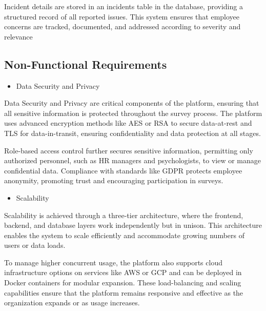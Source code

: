 \documentclass[conference]{IEEEtran}
\begin{document}
    Incident details are stored in an incidents
    table in the database, providing a structured record of all 
    reported issues. This system ensures that employee concerns are 
    tracked, documented, and addressed according to severity and 
    relevance
    \newline    
    \newline  
    
    \subsection {Non-Functional Requirements}
   
    \begin{itemize}
        \item Data Security and Privacy
        \end{itemize}
    
    Data Security and Privacy are critical components of the platform, 
    ensuring that all sensitive information is protected throughout the 
    survey process. The platform uses advanced encryption methods like 
    AES or RSA to secure data-at-rest and TLS for data-in-transit, 
    ensuring confidentiality and data protection at all stages. 
    \newline

    Role-based access control further secures sensitive information, 
    permitting only authorized personnel, such as HR managers and 
    psychologists, to view or manage confidential data. Compliance with
    standards like GDPR protects employee anonymity, promoting trust 
    and encouraging participation in surveys.
    \newline    

    \begin{itemize}
        \item Scalability
        \end{itemize}
    
    Scalability is achieved through a three-tier architecture, where the 
    frontend, backend, and database layers work independently but in 
    unison. This architecture enables the system to scale efficiently 
    and accommodate growing numbers of users or data loads. 
    \newline

    To manage higher concurrent usage, the platform also supports cloud 
    infrastructure options on services like AWS or GCP and can be 
    deployed in Docker containers for modular expansion. These 
    load-balancing and scaling capabilities ensure that the platform 
    remains responsive and effective as the organization expands or as 
    usage increases.
    \newline    
\end{document}
